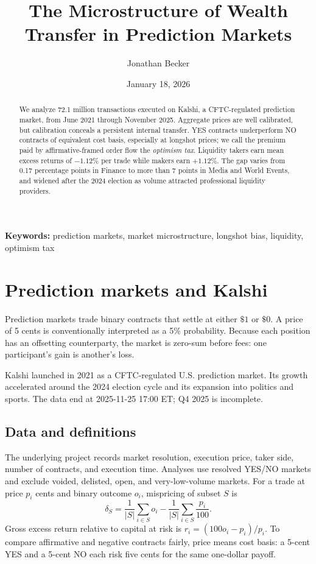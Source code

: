 \documentclass[10pt]{article}
\title{The Microstructure of Wealth Transfer in Prediction Markets}
\author{Jonathan Becker}
\date{January 18, 2026}
\begin{document}
\maketitle
\begin{abstract}
We analyze 72.1 million transactions executed on Kalshi, a CFTC-regulated prediction market, from June 2021 through November 2025. Aggregate prices are well calibrated, but calibration conceals a persistent internal transfer. YES contracts underperform NO contracts of equivalent cost basis, especially at longshot prices; we call the premium paid by affirmative-framed order flow the \textit{optimism tax}. Liquidity takers earn mean excess returns of $-1.12\%$ per trade while makers earn $+1.12\%$. The gap varies from 0.17 percentage points in Finance to more than 7 points in Media and World Events, and widened after the 2024 election as volume attracted professional liquidity providers.
\end{abstract}
\textbf{Keywords:} prediction markets, market microstructure, longshot bias, liquidity, optimism tax

\section{Prediction markets and Kalshi}
Prediction markets trade binary contracts that settle at either $\$1$ or $\$0$. A price of 5 cents is conventionally interpreted as a 5\% probability. Because each position has an offsetting counterparty, the market is zero-sum before fees: one participant's gain is another's loss.

Kalshi launched in 2021 as a CFTC-regulated U.S. prediction market. Its growth accelerated around the 2024 election cycle and its expansion into politics and sports. The data end at 2025-11-25 17:00 ET; Q4 2025 is incomplete.

\subsection{Data and definitions}
The underlying project records market resolution, execution price, taker side, number of contracts, and execution time. Analyses use resolved YES/NO markets and exclude voided, delisted, open, and very-low-volume markets. For a trade at price $p_i$ cents and binary outcome $o_i$, mispricing of subset $S$ is
\[
\delta_S=\frac{1}{|S|}\sum_{i\in S}o_i-\frac{1}{|S|}\sum_{i\in S}\frac{p_i}{100}.
\]
Gross excess return relative to capital at risk is $r_i=(100o_i-p_i)/p_i$. To compare affirmative and negative contracts fairly, price means cost basis: a 5-cent YES and a 5-cent NO each risk five cents for the same one-dollar payoff.
\end{document}
